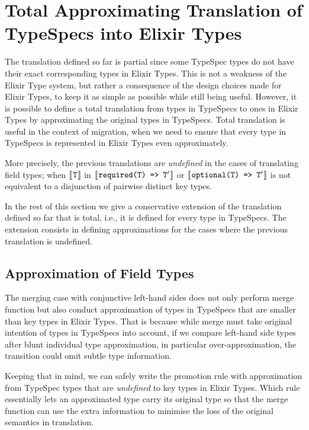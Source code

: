 \section{Total Approximating Translation of TypeSpecs into Elixir Types}
\label{sec:approx-translation}

The translation defined so far is partial since some TypeSpec types do not have their exact corresponding types in Elixir Types. 
This is not a weakness of the Elixir Type system, but rather a consequence of the design choices made for Elixir Types, to keep it as simple as possible while still being useful. 
However, it is possible to define a total translation from types in TypeSpecs to ones in Elixir Types by approximating the original types in TypeSpecs. 
Total translation is useful in the context of migration, when we need to ensure that every type in TypeSpecs is represented in Elixir Types even approximately.

More precisely, the previous translations are \textit{undefined} in the cases of translating field types; when $[\![\hspace{.07em}\texttt{T}\hspace{.07em}]\!]$ in $[\![\hspace{.07em}\texttt{required(\texttt{T}) => $\texttt{T}^{\prime}$}\hspace{.07em}]\!]$ or $[\![\hspace{.07em}\texttt{optional(\texttt{T}) => $\texttt{T}^{\prime}$}\hspace{.07em}]\!]$ is not equivalent to a disjunction of pairwise distinct key types.

In the rest of this section we give a conservative extension of the translation defined so far that is total, i.e., it is defined for every type in TypeSpecs. 
The extension consists in defining approximations for the cases where the previous translation is undefined.

\subsection{Approximation of Field Types}

The merging case with conjunctive left-hand sides does not only perform merge function but also conduct approximation of types in TypeSpecs that are smaller than key types in Elixir Types.
That is because while merge must take original intention of types in TypeSpecs into account, if we compare left-hand side types after blunt individual type approximation, in particular over-approximation, the transition could omit subtle type information.

Keeping that in mind, we can safely write the promotion rule with approximation from TypeSpec types that are \textit{undefined} to key types in Elixir Types.
Which rule essentially lets an approximated type carry its original type so that the merge function can use the extra information to minimise the loss of the original semantics in translation.

